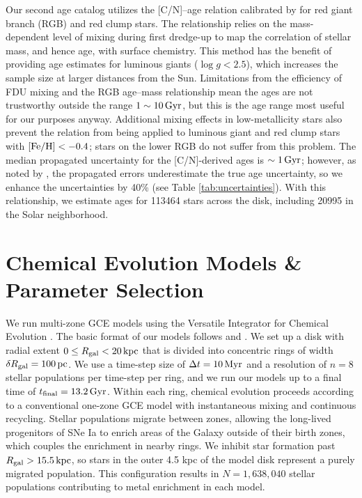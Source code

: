 \documentclass[twocolumn,twocolappendix,linenumbers]{aastex631}
\newcommand{\mathFeH}{{\rm [Fe/H]}}
\newcommand{\kpc}{\,{\rm kpc}}
\newcommand{\Gyr}{\,{\rm Gyr}}
\begin{document}
Our second age catalog utilizes the [C/N]--age relation calibrated by \citet[][submitted]{roberts_cn_2025} for red giant branch (RGB) and red clump stars. The relationship relies on the mass-dependent level of mixing during first dredge-up \citep[FDU;][]{iben_stellar_1967} to map the correlation of stellar mass, and hence age, with surface chemistry. This method has the benefit of providing age estimates for luminous giants ($\log g<2.5$), which increases the sample size at larger distances from the Sun. Limitations from the efficiency of FDU mixing and the RGB age--mass relationship mean the ages are not trustworthy outside the range $1\sim10\Gyr$, but this is the age range most useful for our purposes anyway. Additional mixing effects in low-metallicity stars also prevent the relation from being applied to luminous giant and red clump stars with $\mathFeH<-0.4$; stars on the lower RGB do not suffer from this problem. The median propagated uncertainty for the [C/N]-derived ages is $\sim1\Gyr$; however, as noted by \citet[][submitted]{roberts_cn_2025}, the propagated errors underestimate the true age uncertainty, so we enhance the uncertainties by 40\% (see Table \ref{tab:uncertainties}). With this relationship, we estimate ages for \num{113464} stars across the disk, including \num{20995} in the Solar neighborhood.

\section{Chemical Evolution Models \& Parameter Selection}
\label{sec:methods}

We run multi-zone GCE models using the Versatile Integrator for Chemical Evolution \citep[{\tt VICE};][]{johnson_impact_2020}. The basic format of our models follows \citet{johnson_stellar_2021} and \citet{dubay_galactic_2024}. We set up a disk with radial extent $0\leq R_{\rm gal}<20\kpc$ that is divided into concentric rings of width $\delta R_{\rm gal}=100\,{\rm pc}$. We use a time-step size of $\Delta t=10\,{\rm Myr}$ and a resolution of $n=8$ stellar populations per time-step per ring, and we run our models up to a final time of $t_{\rm final}=13.2\,{\rm Gyr}$. Within each ring, chemical evolution proceeds according to a conventional one-zone GCE model with instantaneous mixing and continuous recycling. Stellar populations migrate between zones, allowing the long-lived progenitors of SNe Ia to enrich areas of the Galaxy outside of their birth zones, which couples the enrichment in nearby rings. We inhibit star formation past $R_{\rm gal}>15.5\kpc$, so stars in the outer 4.5 kpc of the model disk represent a purely migrated population. This configuration results in $N=1,638,040$ stellar populations contributing to metal enrichment in each model.
\end{document}
